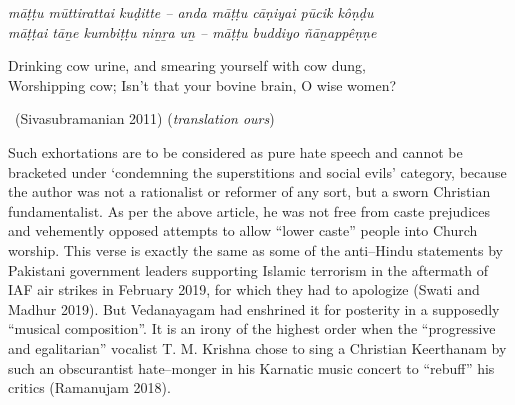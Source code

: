 \begin{myquote}
\textit{māṭṭu mūttirattai kuḍitte – anda māṭṭu cāṇiyai pūcik kôṇḍu\\ māṭṭai tāṉe kumbiṭṭu niṉṟa uṉ – māṭṭu buddiyo ñāṉappêṇṇe}
\end{myquote}

\begin{myquote}
\end{myquote}

\begin{myquote}
Drinking cow urine, and smearing yourself with cow dung,\\ Worshipping cow; Isn’t that your bovine brain, O wise women? 

~\hfill (Sivasubramanian 2011) (\textit{translation ours})
\end{myquote}

\newpage

Such exhortations are to be considered as pure hate speech and cannot be bracketed under ‘condemning the superstitions and social evils’ category, because the author was not a rationalist or reformer of any sort, but a sworn Christian fundamentalist. As per the above article, he was not free from caste prejudices and vehemently opposed attempts to allow “lower caste” people into Church worship. This verse is exactly the same as some of the anti–Hindu statements by Pakistani government leaders supporting Islamic terrorism in the aftermath of IAF air strikes in February 2019, for which they had to apologize (Swati and Madhur 2019). But Vedanayagam had enshrined it for posterity in a supposedly “musical composition”. It is an irony of the highest order when the “progressive and egalitarian” vocalist T. M. Krishna chose to sing a Christian Keerthanam by such an obscurantist hate–monger in his Karnatic music concert to “rebuff” his critics (Ramanujam 2018).

